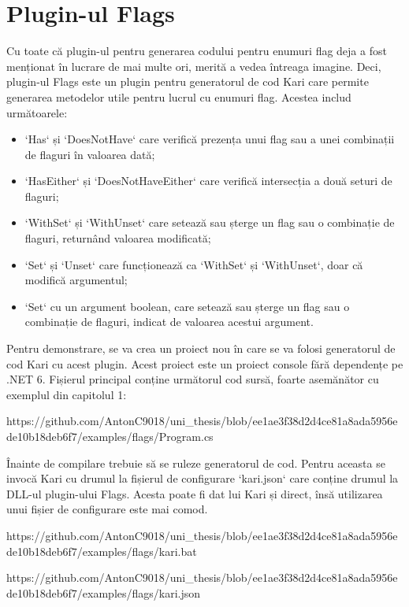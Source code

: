 \documentclass{report}
\begin{document}
\section{Plugin-ul Flags}

Cu toate că plugin-ul pentru generarea codului pentru enumuri flag deja a fost menționat în lucrare de mai multe ori, merită a vedea întreaga imagine.
Deci, plugin-ul Flags este un plugin pentru generatorul de cod Kari care permite generarea metodelor utile pentru lucrul cu enumuri flag.
Acestea includ următoarele:

\begin{itemize}
  \item `Has` și `DoesNotHave` care verifică prezența unui flag sau a unei combinații de flaguri în valoarea dată;
  \item `HasEither` și `DoesNotHaveEither` care verifică intersecția a două seturi de flaguri;
  \item `WithSet` și `WithUnset` care setează sau șterge un flag sau o combinație de flaguri, returnând valoarea modificată;
  \item `Set` și `Unset` care funcționează ca `WithSet` și `WithUnset`, doar că modifică argumentul;
  \item `Set` cu un argument boolean, care setează sau șterge un flag sau o combinație de flaguri, indicat de valoarea acestui argument.
\end{itemize}

Pentru demonstrare, se va crea un proiect nou în care se va folosi generatorul de cod Kari cu acest plugin.
Acest proiect este un proiect console fără dependențe pe .NET 6.
Fișierul principal conține următorul cod sursă, foarte asemănător cu exemplul din capitolul 1:

https://github.com/AntonC9018/uni_thesis/blob/ee1ae3f38d2d4ce81a8ada5956ede10b18deb6f7/examples/flags/Program.cs


Înainte de compilare trebuie să se ruleze generatorul de cod.
Pentru aceasta se invocă Kari cu drumul la fișierul de configurare `kari.json` care conține drumul la DLL-ul plugin-ului Flags.
Acesta poate fi dat lui Kari și direct, însă utilizarea unui fișier de configurare este mai comod.

https://github.com/AntonC9018/uni_thesis/blob/ee1ae3f38d2d4ce81a8ada5956ede10b18deb6f7/examples/flags/kari.bat

https://github.com/AntonC9018/uni_thesis/blob/ee1ae3f38d2d4ce81a8ada5956ede10b18deb6f7/examples/flags/kari.json
\end{document}
